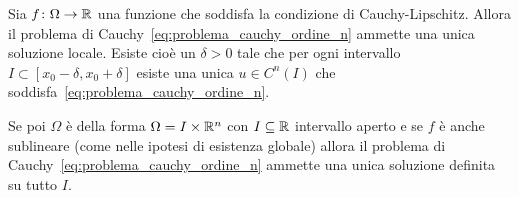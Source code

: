 \begin{theorem}
\label{th:cauchy_lipschitz_ordine_n}
%
Sia $f\colon \Omega\to {\mathbb R}$
una funzione che soddisfa la condizione di Cauchy-Lipschitz.
Allora il problema di Cauchy~\eqref{eq:problema_cauchy_ordine_n}
ammette una unica soluzione locale.
Esiste cioè un $\delta>0$ tale che per ogni intervallo
$I\subset [x_0-\delta,x_0+\delta]$ esiste una unica $u\in C^n(I)$ che
soddisfa~\eqref{eq:problema_cauchy_ordine_n}.

%
Se poi $\Omega$ è della forma $\Omega = I \times {\mathbb R}^n$ con $I\subseteq {\mathbb R}$ intervallo aperto e se
$f$ è anche sublineare (come nelle ipotesi di esistenza globale) allora il problema di Cauchy~\eqref{eq:problema_cauchy_ordine_n} ammette una unica soluzione definita su tutto $I$.
\end{theorem}
%
